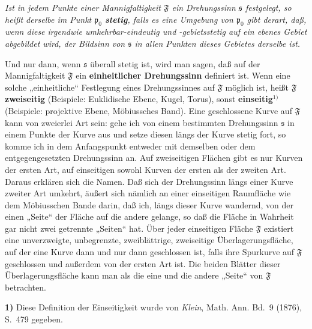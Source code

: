 \documentclass{article}
\begin{document}
\emph{Ist in jedem Punkte einer Mannigfaltigkeit $\mathfrak{F}$ ein Drehungssinn $\mathfrak{s}$ festgelegt, so heißt derselbe im Punkt $\mathfrak{p}_0$ \textbf{stetig}, falls es eine Umgebung von $\mathfrak{p}_0$ gibt derart, daß, wenn diese irgendwie umkehrbar-eindeutig und -gebietsstetig auf ein ebenes Gebiet abgebildet wird, der Bildsinn von $\mathfrak{s}$ in allen Punkten dieses Gebietes derselbe ist.}

Und nur dann, wenn $\mathfrak{s}$ überall stetig ist, wird man sagen, daß auf der Mannigfaltigkeit $\mathfrak{F}$ ein \textbf{einheitlicher Drehungssinn} definiert ist. Wenn eine solche „einheitliche“ Festlegung eines Drehungssinnes auf $\mathfrak{F}$ möglich ist, heißt $\mathfrak{F}$ \textbf{zweiseitig} (Beispiele: Euklidische Ebene, Kugel, Torus), sonst \textbf{einseitig}${}^{1)}$ (Beispiele: projektive Ebene, Möbiussches Band). Eine geschlossene Kurve auf $\mathfrak{F}$ kann von zweierlei Art sein: gehe ich von einem bestimmten Drehungssinn $\mathfrak{s}$ in einem Punkte der Kurve aus und setze diesen längs der Kurve stetig fort, so komme ich in dem Anfangspunkt entweder mit demselben oder dem entgegengesetzten Drehungssinn an. Auf zweiseitigen Flächen gibt es nur Kurven der ersten Art, auf einseitigen sowohl Kurven der ersten als der zweiten Art. Daraus erklären sich die Namen. Daß sich der Drehungssinn längs einer Kurve zweiter Art umkehrt, äußert sich nämlich an einer einseitigen Raumfläche wie dem Möbiusschen Bande darin, daß ich, längs dieser Kurve wandernd, von der einen „Seite“ der Fläche auf die andere gelange, so daß die Fläche in Wahrheit gar nicht zwei getrennte „Seiten“ hat. Über jeder einseitigen Fläche $\mathfrak{F}$ existiert eine unverzweigte, unbegrenzte, zweiblättrige, zweiseitige Überlagerungsfläche, auf der eine Kurve dann und nur dann geschlossen ist, falls ihre Spurkurve auf $\mathfrak{F}$ geschlossen und außerdem von der ersten Art ist. Die beiden Blätter dieser Überlagerungsfläche kann man als die eine und die andere „Seite“ von $\mathfrak{F}$ betrachten.

\textbf{1)} Diese Definition der Einseitigkeit wurde von \emph{Klein}, Math. Ann. Bd.~9 (1876), S.~479 gegeben.
\end{document}
